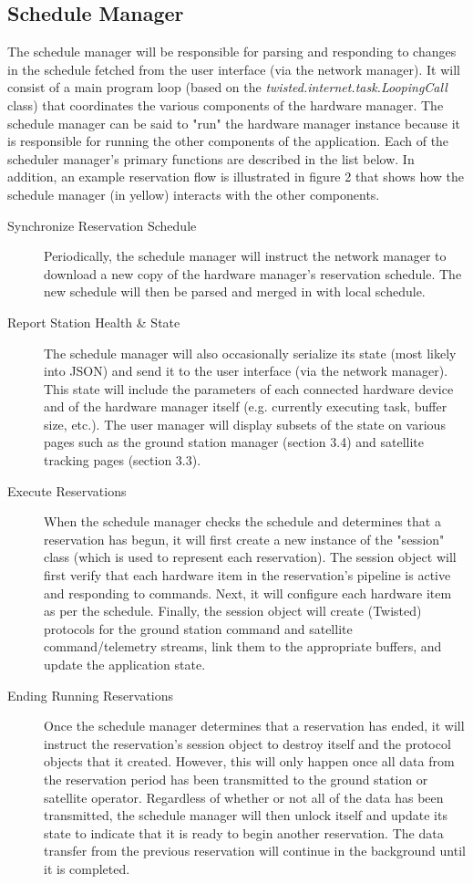 \documentclass{mxl-design}
\begin{document}
\subsection{Schedule Manager}
The schedule manager will be responsible for parsing and responding to changes in the schedule fetched from the user interface (via the network manager). It will consist of a main program loop (based on the \textit{twisted.internet.task.LoopingCall} class) that coordinates the various components of the hardware manager. The schedule manager can be said to "run" the hardware manager instance because it is responsible for running the other components of the application. Each of the scheduler manager's primary functions are described in the list below. In addition, an example reservation flow is illustrated in figure 2 that shows how the schedule manager (in yellow) interacts with the other components.

\begin{description}
	\item[Synchronize Reservation Schedule] Periodically, the schedule manager will instruct the network manager to download a new copy of the hardware manager's reservation schedule. The new schedule will then be parsed and merged in with local schedule.
	\item[Report Station Health \& State] The schedule manager will also occasionally serialize its state (most likely into JSON) and send it to the user interface (via the network manager). This state will include the parameters of each connected hardware device and of the hardware manager itself (e.g. currently executing task, buffer size, etc.). The user manager will display subsets of the state on various pages such as the ground station manager (section 3.4) and satellite tracking pages (section 3.3).
	\item[Execute Reservations] When the schedule manager checks the schedule and determines that a reservation has begun, it will first create a new instance of the "session" class (which is used to represent each reservation). The session object will first verify that each hardware item in the reservation's pipeline is active and responding to commands. Next, it will configure each hardware item as per the schedule. Finally, the session object will create (Twisted) protocols for the ground station command and satellite command/telemetry streams, link them to the appropriate buffers, and update the application state.
	\item[Ending Running Reservations] Once the schedule manager determines that a reservation has ended, it will instruct the reservation's session object to destroy itself and the protocol objects that it created. However, this will only happen once all data from the reservation period has been transmitted to the ground station or satellite operator. Regardless of whether or not all of the data has been transmitted, the schedule manager will then unlock itself and update its state to indicate that it is ready to begin another reservation. The data transfer from the previous reservation will continue in the background until it is completed.
\end{description}
\end{document}
